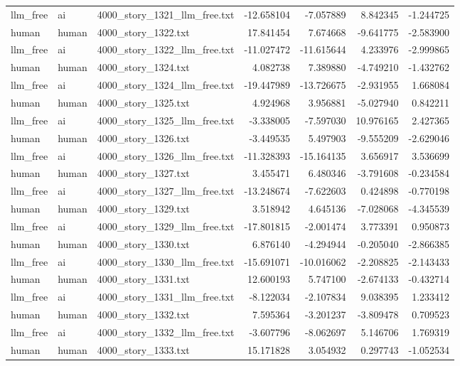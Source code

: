 \begin{longtable}{lllrrrr}
llm\_free & ai & 4000\_story\_1321\_llm\_free.txt & -12.658104 & -7.057889 & 8.842345 & -1.244725 \\
human & human & 4000\_story\_1322.txt & 17.841454 & 7.674668 & -9.641775 & -2.583900 \\
llm\_free & ai & 4000\_story\_1322\_llm\_free.txt & -11.027472 & -11.615644 & 4.233976 & -2.999865 \\
human & human & 4000\_story\_1324.txt & 4.082738 & 7.389880 & -4.749210 & -1.432762 \\
llm\_free & ai & 4000\_story\_1324\_llm\_free.txt & -19.447989 & -13.726675 & -2.931955 & 1.668084 \\
human & human & 4000\_story\_1325.txt & 4.924968 & 3.956881 & -5.027940 & 0.842211 \\
llm\_free & ai & 4000\_story\_1325\_llm\_free.txt & -3.338005 & -7.597030 & 10.976165 & 2.427365 \\
human & human & 4000\_story\_1326.txt & -3.449535 & 5.497903 & -9.555209 & -2.629046 \\
llm\_free & ai & 4000\_story\_1326\_llm\_free.txt & -11.328393 & -15.164135 & 3.656917 & 3.536699 \\
human & human & 4000\_story\_1327.txt & 3.455471 & 6.480346 & -3.791608 & -0.234584 \\
llm\_free & ai & 4000\_story\_1327\_llm\_free.txt & -13.248674 & -7.622603 & 0.424898 & -0.770198 \\
human & human & 4000\_story\_1329.txt & 3.518942 & 4.645136 & -7.028068 & -4.345539 \\
llm\_free & ai & 4000\_story\_1329\_llm\_free.txt & -17.801815 & -2.001474 & 3.773391 & 0.950873 \\
human & human & 4000\_story\_1330.txt & 6.876140 & -4.294944 & -0.205040 & -2.866385 \\
llm\_free & ai & 4000\_story\_1330\_llm\_free.txt & -15.691071 & -10.016062 & -2.208825 & -2.143433 \\
human & human & 4000\_story\_1331.txt & 12.600193 & 5.747100 & -2.674133 & -0.432714 \\
llm\_free & ai & 4000\_story\_1331\_llm\_free.txt & -8.122034 & -2.107834 & 9.038395 & 1.233412 \\
human & human & 4000\_story\_1332.txt & 7.595364 & -3.201237 & -3.809478 & 0.709523 \\
llm\_free & ai & 4000\_story\_1332\_llm\_free.txt & -3.607796 & -8.062697 & 5.146706 & 1.769319 \\
human & human & 4000\_story\_1333.txt & 15.171828 & 3.054932 & 0.297743 & -1.052534 \\

\end{longtable}
